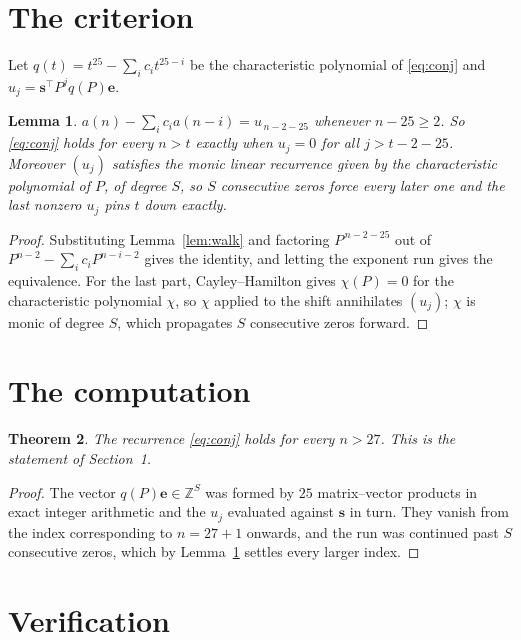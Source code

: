 \documentclass[11pt,a4paper]{article}
\theoremstyle{plain}
\newtheorem{theorem}{Theorem}
\newtheorem{lemma}[theorem]{Lemma}
\theoremstyle{definition}
\begin{document}
\section{The criterion}

Let $q(t)=t^{25}-\sum_i c_i t^{25-i}$ be the characteristic polynomial of
\eqref{eq:conj} and $u_j=\mathbf{s}^{\!\top}P^{j}q(P)\mathbf{e}$.

\begin{lemma}\label{lem:crit}
$a(n)-\sum_i c_i a(n-i)=u_{\,n-2-25}$ whenever $n-25\ge2$. So \eqref{eq:conj}
holds for every $n>t$ exactly when $u_j=0$ for all $j>t-2-25$. Moreover $(u_j)$
satisfies the monic linear recurrence given by the characteristic polynomial of $P$, of
degree $S$, so $S$ consecutive zeros force every later one and the last nonzero $u_j$ pins
$t$ down exactly.
\end{lemma}

\begin{proof}
Substituting Lemma~\ref{lem:walk} and factoring $P^{\,n-2-25}$ out of
$P^{n-2}-\sum_i c_i P^{n-i-2}$ gives the identity, and letting the exponent run gives the
equivalence. For the last part, Cayley--Hamilton gives $\chi(P)=0$ for the characteristic
polynomial $\chi$, so $\chi$ applied to the shift annihilates $(u_j)$; $\chi$ is monic of
degree $S$, which propagates $S$ consecutive zeros forward.
\end{proof}

\section{The computation}

\begin{theorem}
The recurrence \eqref{eq:conj} holds for every $n>27$. This is the statement of
Section~1.
\end{theorem}

\begin{proof}
The vector $q(P)\mathbf{e}\in\mathbb{Z}^{S}$ was formed by $25$ matrix--vector
products in exact integer arithmetic and the $u_j$ evaluated against $\mathbf{s}$ in turn.
They vanish from the index corresponding to $n=27+1$ onwards, and the run was continued
past $S$ consecutive zeros, which by Lemma~\ref{lem:crit} settles every larger index.
\end{proof}

\section{Verification}
\end{document}
